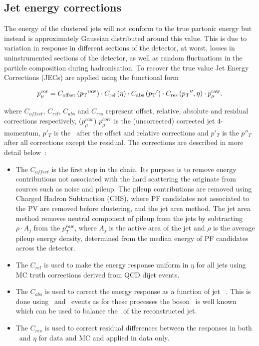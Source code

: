 \subsection{Jet energy corrections}

The energy of the clustered jets will not conform to the true partonic energy but instead is approximately Gaussian distributed around this value.
This is due to variation in response in different sections of the detector, at worst, losses in uninstrumented sections of the detector, as well as 
random fluctuations in the particle composition during hadronisation. To recover the true value Jet Energy Corrections (JECs) are applied using the functional
form~\cite{jec}

\begin{equation}
\label{equ:jec}
  p_{\mu}^{\rm{cor}}=C_{\rm{offset}}\left({p_{\text T}}^{\rm{raw}}\right)\cdot
  C_{\rm{rel}}\left(\eta\right)\cdot C_{\rm{abs}}\left({p_{\text T}}'\right)\cdot
  C_{\rm{res}}\left({p_{\text T}}'',\eta\right)\cdot p_{\mu}^{\rm{raw}}.
\end{equation}

where $C_{offset}$, $C_{rel}$, $C_{abs}$ and $C_{res}$ represent offset,
relative, absolute and residual corrections respectively, 
 ($p_{\mu}^{raw}$) $p_{\mu}^{corr}$ is the (uncorrected) corrected jet 4-momentum, $p'_T$ is the \pt~after the 
 offset and relative corrections and  $p'_T$ is the $p''_T$ after
all corrections except the residual. The corrections are described in more detail below~\cite{jec2}:

\begin{itemize}
\item The $C_{offset}$ is the first step in the chain. Its purpose is to remove
energy contributions not associated with the hard scattering the originate from sources
such as noise and pileup. The pileup contributions are removed using Charged
Hadron Subtraction (CHS), where PF candidates not associated to the PV
are removed before clustering, and the jet area method. The jet area method removes neutral component 
of pileup from the jets by subtracting $\rho \cdot A_j$
from the $p^{raw}_T$, where $A_j$ is the active area of the jet and $\rho$ 
is the average pileup energy density, determined from the median energy of PF candidates
across the detector. 
\item The $C_{rel}$ is used to make the energy response uniform in $\eta$ for all jets using MC truth corrections derived from QCD dijet events.
\item The $C_{abs}$ is used to correct the energy response as a function of jet \pt~. This is done using \zj~and \gj~events as for
these processes the boson \pt~is well known which can be used to balance the \pt~of the reconstructed jet.
\item The $C_{res}$ is used to correct residual differences between the responses in both \pt~and $\eta$ for data and MC and applied in data only.
\end{itemize}

